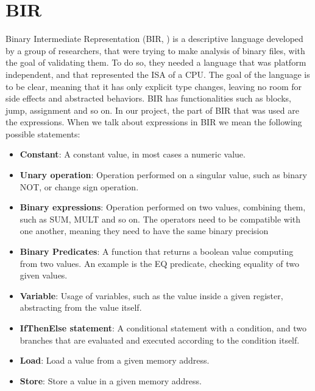 \section{BIR}
\label{cha:BIR} Binary Intermediate Representation (BIR, \cite{bir_pub}) is a
descriptive language developed by a group of researchers, that were trying to make
analysis of binary files, with the goal of validating them. To do so, they
needed a language that was platform independent, and that represented the ISA of
a CPU. The goal of the language is to be clear, meaning that it has only explicit
type changes, leaving no room for side effects and abstracted behaviors. BIR has
functionalities such as blocks, jump, assignment and so on. In our project, the part
of BIR that was used are the expressions. When we talk about expressions in BIR
we mean the following possible statements:
\begin{itemize}
  \item \textbf{Constant}: A constant value, in most cases a numeric value.

  \item \textbf{Unary operation}: Operation performed on a singular value, such
    as binary NOT, or change sign operation.

  \item \textbf{Binary expressions}: Operation performed on two values,
    combining them, such as SUM, MULT and so on. The operators need to be compatible
    with one another, meaning they need to have the same binary precision

  \item \textbf{Binary Predicates}: A function that returns a boolean value computing
    from two values. An example is the EQ predicate, checking equality of two given
    values.

  \item \textbf{Variable}: Usage of variables, such as the value inside a given
    register, abstracting from the value itself.

  \item \textbf{IfThenElse statement}: A conditional statement with a condition,
    and two branches that are evaluated and executed according to the condition
    itself.

  \item \textbf{Load}: Load a value from a given memory address.

  \item \textbf{Store}: Store a value in a given memory address.


\end{itemize}
